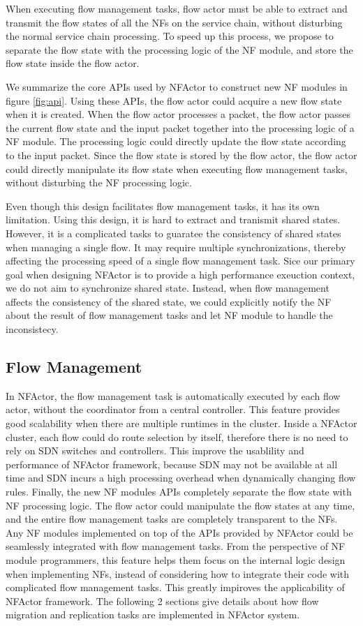When executing flow management tasks, flow actor must be able to extract and transmit the flow states of all the NFs on the service chain, without disturbing the normal service chain processing. To speed up this process, we propose to separate the flow state with the processing logic of the NF module, and store the flow state inside the flow actor.

We summarize the core APIs used by NFActor to construct new NF modules in figure \ref{fig:api}. Using these APIs, the flow actor could acquire a new flow state when it is created. When the flow actor processes a packet, the flow actor passes the current flow state and the input packet together into the processing logic of a NF module. The processing logic could directly update the flow state according to the input packet. Since the flow state is stored by the flow actor, the flow actor could directly manipulate its flow state when executing flow management tasks, without disturbing the NF processing logic.

Even though this design facilitates flow management tasks, it has its own limitation. Using this design, it is hard to extract and tranismit shared states. However, it is a complicated tasks to guaratee the consistency of shared states when managing a single flow. It may require multiple synchronizations, thereby affecting the processing speed of a single flow management task. Sice our primary goal when designing NFActor is to provide a high performance exeuction context, we do not aim to synchronize shared state. Instead, when flow management affects the consistency of the shared state, we could explicitly notify the NF about the result of flow management tasks and let NF module to handle the inconsistecy.

\subsection{Flow Management}

In NFActor, the flow management task is automatically executed by each flow actor, without the coordinator from a central controller. This feature provides good scalability when there are multiple runtimes in the cluster. Inside a NFActor cluster, each flow could do route selection by itself, therefore there is no need to rely on SDN switches and controllers. This improve the usablility and performance of NFActor framework, because SDN may not be available at all time and SDN incurs a high processing overhead when dynamically changing flow rules. Finally, the new NF modules APIs completely separate the flow state with NF processing logic. The flow actor could manipulate the flow states at any time, and the entire flow management tasks are completely transparent to the NFs. Any NF modules implemented on top of the APIs provided by NFActor could be seamlessly integrated with flow management tasks. From the perspective of NF module programmers, this feature helps them focus on the internal logic design when implementing NFs, instead of considering how to integrate their code with complicated flow management tasks. This greatly impiroves the applicability of NFActor framework. The following 2 sections give details about how flow migration and replication tasks are implemented in NFActor system.

